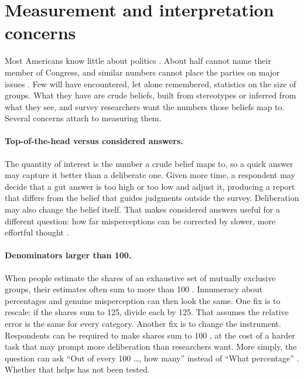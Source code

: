 \documentclass[11pt]{article}
\begin{document}
\section{Measurement and interpretation concerns}

Most Americans know little about politics \citep{campbell1960, dellicarpini1996}. About half cannot name their member of Congress, and similar numbers cannot place the parties on major issues \citep{freeder2016}. Few will have encountered, let alone remembered, statistics on the size of groups. What they have are crude beliefs, built from stereotypes or inferred from what they see, and survey researchers want the numbers those beliefs map to. Several concerns attach to measuring them.

\paragraph{Top-of-the-head versus considered answers.} The quantity of interest is the number a crude belief maps to, so a quick answer may capture it better than a deliberate one. Given more time, a respondent may decide that a gut answer is too high or too low and adjust it, producing a report that differs from the belief that guides judgments outside the survey. Deliberation may also change the belief itself. That makes considered answers useful for a different question: how far misperceptions can be corrected by slower, more effortful thought \citep{kahneman2011, petty1986}.

\paragraph{Denominators larger than 100.} When people estimate the shares of an exhaustive set of mutually exclusive groups, their estimates often sum to more than 100 \citep{wong2007}. Innumeracy about percentages and genuine misperception can then look the same. One fix is to rescale: if the shares sum to 125, divide each by 125. That assumes the relative error is the same for every category. Another fix is to change the instrument. Respondents can be required to make shares sum to 100 \citep{ahler2018}, at the cost of a harder task that may prompt more deliberation than researchers want. More simply, the question can ask ``Out of every 100 \ldots, how many'' instead of ``What percentage'' \citep{sides2007b}. Whether that helps has not been tested.
\end{document}
